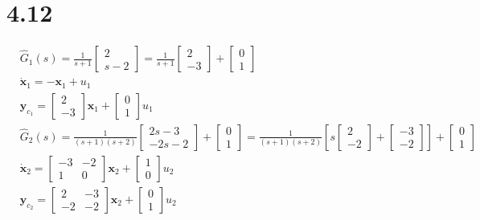 \documentclass{article}
\begin{document}
\section*{4.12}
$$
\begin{aligned}
&\hat{G}_{1}(s)=\frac{1}{s+1}\left[\begin{array}{c}
2 \\
s-2
\end{array}\right]=\frac{1}{s+1}\left[\begin{array}{c}
2 \\
-3
\end{array}\right]+\left[\begin{array}{l}
0 \\
1
\end{array}\right]\\
&\dot{\pmb{x}}_{1}=-\pmb{x}_{1}+u_{1}\\
&\pmb{y}_{c_{1}}=\left[\begin{array}{c}
2 \\
-3
\end{array}\right]\pmb{x}_{1}+\left[\begin{array}{l}
0 \\
1
\end{array}\right] u_{1}\\
&\hat{G}_{2}(s)=\frac{1}{(s+1)(s+2)}\left[\begin{array}{c}
2 s-3 \\
-2 s-2
\end{array}\right]+\left[\begin{array}{l}
0 \\
1
\end{array}\right]=\frac{1}{(s+1)(s+2)}\left[s\left[\begin{array}{c}
2 \\
-2
\end{array}\right]+\left[\begin{array}{c}
-3 \\
-2
\end{array}\right]\right]+\left[\begin{array}{l}
0 \\
1
\end{array}\right]\\
&\dot{\pmb{x}}_{2}=\left[\begin{array}{cc}
-3 & -2 \\
1 & 0
\end{array}\right] \pmb{x}_{2}+\left[\begin{array}{l}
1 \\
0
\end{array}\right] u_{2}\\
&\pmb{y}_{c_{2}}=\left[\begin{array}{cc}
2 & -3 \\
-2 & -2
\end{array}\right] \pmb{x}_{2}+\left[\begin{array}{l}
0 \\
1
\end{array}\right] u_{2}
\end{aligned}
$$
\end{document}
